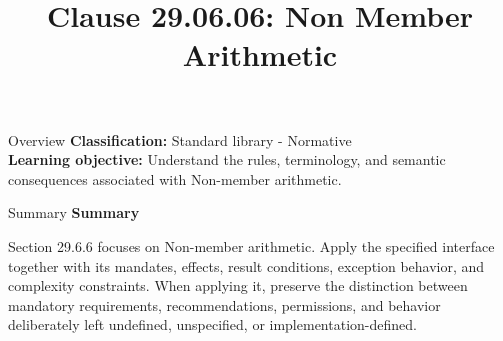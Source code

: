 \documentclass[10pt,letterpaper]{article}
\title{Clause 29.06.06: Non Member Arithmetic}
\author{}
\date{}
\begin{document}
\maketitle
\begin{CornellOverviewBox}{Overview}
\textbf{Classification:} Standard library - Normative\\[2pt]
\textbf{Learning objective:} Understand the rules, terminology, and semantic consequences associated with Non-member arithmetic.
\end{CornellOverviewBox}\begin{CornellSummaryBox}{Summary}
{\sffamily\bfseries\color{Accent} Summary}\par\vspace{3pt}Section 29.6.6 focuses on Non-member arithmetic. Apply the specified interface together with its mandates, effects, result conditions, exception behavior, and complexity constraints. When applying it, preserve the distinction between mandatory requirements, recommendations, permissions, and behavior deliberately left undefined, unspecified, or implementation-defined.
\end{CornellSummaryBox}
\end{document}

